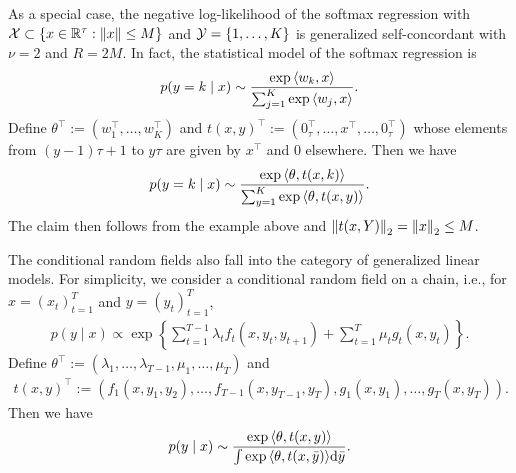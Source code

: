As a special case, the negative log-likelihood of the softmax regression with $\mathcal{X} \subset \{x \in {\mathbb R}^\tau: \left\lVert x \right\rVert \le M\}$ and $\mathcal{Y} = \{1, \dots, K\}$ is generalized self-concordant with $\nu = 2$ and $R = 2M$.
In fact, the statistical model of the softmax regression is
\begin{align*}
    p(y = k \mid x) \sim \frac{\exp{{\langle w_k, x \rangle}}}{\sum_{j=1}^K \exp{{\langle w_j, x \rangle}}}.
\end{align*}
Define $\theta^\top := (w_1^\top, \dots, w_K^\top)$ and $t(x, y)^\top := (0_\tau^\top, \dots, x^\top, \dots, 0_\tau^\top)$ whose elements from $(y-1)\tau + 1$ to $y\tau$ are given by $x^\top$ and 0 elsewhere.
Then we have
\begin{align*}
    p(y=k \mid x) \sim \frac{\exp{{\langle \theta, t(x, k) \rangle}}}{\sum_{y=1}^K \exp{{\langle \theta, t(x, y) \rangle}}}.
\end{align*}
The claim then follows from the example above and $\left\lVert t(x, Y) \right\rVert_2 = \left\lVert x \right\rVert_2 \le M$.

The conditional random fields \citep{lafferty2001conditional} also fall into the category of generalized linear models.
For simplicity, we consider a conditional random field on a chain, i.e., for $x = (x_t)_{t=1}^T$ and $y = (y_t)_{t=1}^T$,
\begin{align*}
    p(y \mid x) \propto \exp\left\{ \sum_{t=1}^{T-1} \lambda_t f_t(x, y_t, y_{t+1}) + \sum_{t=1}^T \mu_t g_t(x, y_t) \right\}.
\end{align*}
Define $\theta^\top := (\lambda_1, \dots, \lambda_{T-1}, \mu_1, \dots, \mu_T)$ and
\begin{align*}
    t(x, y)^\top := \left( f_1(x, y_1, y_2), \dots, f_{T-1}(x, y_{T-1}, y_T), g_1(x, y_1), \dots, g_T(x, y_T) \right).
\end{align*}
Then we have
\begin{align*}
    p(y \mid x) \sim \frac{\exp{\langle \theta, t(x, y) \rangle}}{\int \exp{\langle \theta, t(x, \bar y) \rangle} \mathrm{d} \bar y}.
\end{align*}

